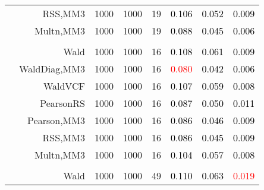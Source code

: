 \documentclass[
]{article}
\begin{document}
\begin{table}[H]
{\begin{tabular}[t]{lrrrrrrr}
\hspace{1em} & RSS,MM3 & 1000 & 1000 & 19 & \textcolor{black}{0.106} & \textcolor{black}{0.052} & \textcolor{black}{0.009}\\

\hspace{1em} & Multn,MM3 & 1000 & 1000 & 19 & \textcolor{black}{0.088} & \textcolor{black}{0.045} & \textcolor{black}{0.006}\\
\cmidrule{1-8}
\addlinespace[0.3em]
\multicolumn{8}{l}{\textbf{2F 10V}}\\
\hspace{1em} & Wald & 1000 & 1000 & 16 & \textcolor{black}{0.108} & \textcolor{black}{0.061} & \textcolor{black}{0.009}\\

\hspace{1em} & WaldDiag,MM3 & 1000 & 1000 & 16 & \textcolor{red}{0.080} & \textcolor{black}{0.042} & \textcolor{black}{0.006}\\

\hspace{1em} & WaldVCF & 1000 & 1000 & 16 & \textcolor{black}{0.107} & \textcolor{black}{0.059} & \textcolor{black}{0.008}\\

\hspace{1em} & PearsonRS & 1000 & 1000 & 16 & \textcolor{black}{0.087} & \textcolor{black}{0.050} & \textcolor{black}{0.011}\\

\hspace{1em} & Pearson,MM3 & 1000 & 1000 & 16 & \textcolor{black}{0.086} & \textcolor{black}{0.046} & \textcolor{black}{0.009}\\

\hspace{1em} & RSS,MM3 & 1000 & 1000 & 16 & \textcolor{black}{0.086} & \textcolor{black}{0.045} & \textcolor{black}{0.009}\\

\hspace{1em} & Multn,MM3 & 1000 & 1000 & 16 & \textcolor{black}{0.104} & \textcolor{black}{0.057} & \textcolor{black}{0.008}\\
\cmidrule{1-8}
\addlinespace[0.3em]
\multicolumn{8}{l}{\textbf{3F 15V}}\\
\hspace{1em} & Wald & 1000 & 1000 & 49 & \textcolor{black}{0.110} & \textcolor{black}{0.063} & \textcolor{red}{0.019}\\


\end{tabular}}
\end{table}
\end{document}

